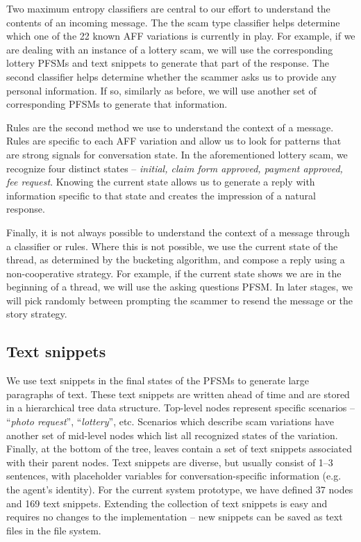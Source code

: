 Two maximum entropy classifiers are central to our effort to understand the contents of an incoming message. The the scam type classifier helps determine which one of the 22 known AFF variations is currently in play. For example, if we are dealing with an instance of a lottery scam, we will use the corresponding lottery PFSMs and text snippets to generate that part of the response. The second classifier helps determine whether the scammer asks us to provide any personal information. If so, similarly as before, we will use another set of corresponding PFSMs to generate that information.

Rules are the second method we use to understand the context of a message. Rules are specific to each AFF variation and allow us to look for patterns that are strong signals for conversation state. In the aforementioned lottery scam, we recognize four distinct states -- \textit{initial, claim form approved, payment approved, fee request}. Knowing the current state allows us to generate a reply with information specific to that state and creates the impression of a natural response.

Finally, it is not always possible to understand the context of a message through a classifier or rules.
Where this is not possible, we use the current state of the thread, as determined by the bucketing algorithm, and compose a reply using a non-cooperative strategy. For example, if the current state shows we are in the beginning of a thread, we will use the asking questions PFSM. In later stages, we will pick randomly between prompting the scammer to resend the message or the story strategy.

\subsection{Text snippets}

We use text snippets in the final states of the PFSMs to generate large paragraphs of text. These text snippets are written ahead of time and are stored in a hierarchical tree data structure. Top-level nodes represent specific scenarios -- “\textit{photo request}”, “\textit{lottery}”, etc. Scenarios which describe scam variations have another set of mid-level nodes which list all recognized states of the variation. Finally, at the bottom of the tree, leaves contain a set of text snippets associated with their parent nodes. Text snippets are diverse, but usually consist of 1--3 sentences, with placeholder variables for conversation-specific information (e.g. the agent's identity). For the current system prototype, we have defined 37 nodes and 169 text snippets. Extending the collection of text snippets is easy and requires no changes to the implementation -- new snippets can be saved as text files in the file system.

